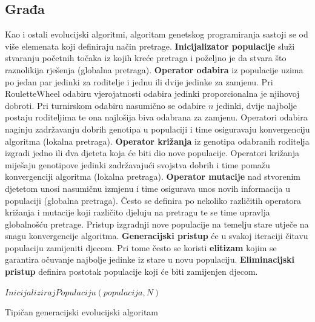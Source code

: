 \documentclass[times, utf8, numeric, diplomski]{fer}
\begin{document}
\subsection{Građa}
Kao i ostali evolucijski algoritmi, algoritam genetskog programiranja sastoji se od više elemenata koji definiraju način pretrage. \textbf{Inicijalizator populacije} služi stvaranju početnih točaka iz kojih kreće pretraga i poželjno je da stvara što raznolikija rješenja (globalna pretraga). \textbf{Operator odabira} iz populacije uzima po jedan par jedinki za roditelje i jednu ili dvije jedinke za zamjenu. Pri RouletteWheel odabiru vjerojatnosti odabira jedinki proporcionalna je njihovoj dobroti. Pri turnirskom odabiru nasumično se odabire $n$ jedinki, dvije najbolje postaju roditeljima te ona najlošija biva odabrana za zamjenu. Operatori odabira naginju zadržavanju dobrih genotipa u populaciji i time osiguravaju konvergenciju algoritma (lokalna pretraga). \textbf{Operator križanja} iz genotipa odabranih roditelja izgradi jedno ili dva djeteta koja će biti dio nove populacije. Operatori križanja miješaju genotipove jedinki zadržavajući svojstva dobrih i time pomažu konvergenciji algoritma (lokalna pretraga). \textbf{Operator mutacije} nad stvorenim djetetom unosi nasumičnu izmjenu i time osigurava unos novih informacija u populaciji (globalna pretraga). Često se definira po nekoliko različitih operatora križanja i mutacije koji različito djeluju na pretragu te se time upravlja globalnošću pretrage. Pristup izgradnji nove populacije na temelju stare utječe na snagu konvergencije algoritma. \textbf{Generacijski pristup} će u svakoj iteraciji čitavu populaciju zamijeniti djecom. Pri tome često se koristi \textbf{elitizam} kojim se garantira očuvanje najbolje jedinke iz stare u novu populaciju. \textbf{Eliminacijski pristup} definira postotak populacije koji će biti zamijenjen djecom.
\newline
\newline
\begin{algorithm}[H]
\DontPrintSemicolon
{}
$InicijalizirajPopulaciju(populacija, N)$ \;
\;
\caption{Tipičan generacijski evolucijski algoritam}
\label{alg:ea}
\end{algorithm}
\end{document}
